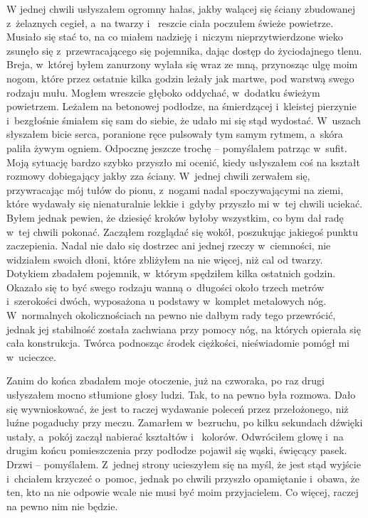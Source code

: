 W jednej chwili usłyszałem ogromny hałas, jakby walącej się ściany zbudowanej z~żelaznych cegieł, a~na twarzy i~
reszcie ciała poczułem świeże powietrze. Musiało się stać to, na co miałem nadzieję i~niczym nieprzytwierdzone wieko 
zsunęło się z~przewracającego się pojemnika, dając dostęp do życiodajnego tlenu. Breja, w~której byłem zanurzony 
wylała się wraz ze mną, przynosząc ulgę moim nogom, które przez ostatnie kilka godzin leżały jak martwe, pod warstwą 
swego rodzaju mułu. Mogłem wreszcie głęboko oddychać, w~dodatku świeżym powietrzem. Leżałem na betonowej podłodze, na 
śmierdzącej i~kleistej pierzynie i~bezgłośnie śmiałem się sam do siebie, że udało mi się stąd wydostać. W~uszach 
słyszałem bicie serca, poranione ręce pulsowały tym samym rytmem, a~skóra paliła żywym ogniem. Odpocznę jeszcze 
trochę -- pomyślałem patrząc w~sufit. Moją sytuację bardzo szybko przyszło mi ocenić, kiedy usłyszałem coś na kształt 
rozmowy dobiegający jakby zza ściany. W~jednej chwili zerwałem się, przywracając mój tułów do pionu, z~nogami nadal 
spoczywającymi na ziemi, które wydawały się nienaturalnie lekkie i~gdyby przyszło mi w~tej chwili uciekać. Byłem 
jednak pewien, że dziesięć kroków byłoby wszystkim, co bym dał radę w~tej chwili pokonać. Zacząłem rozglądać się 
wokół, poszukując jakiegoś punktu zaczepienia. Nadal nie dało się dostrzec ani jednej rzeczy w~ciemności, nie 
widziałem swoich dłoni, które zbliżyłem na nie więcej, niż cal od twarzy. Dotykiem zbadałem pojemnik, w~którym 
spędziłem kilka ostatnich godzin. Okazało się to być swego rodzaju wanną o~długości około trzech metrów i~szerokości 
dwóch, wyposażona u podstawy w~komplet metalowych nóg. W~normalnych okolicznościach na pewno nie dałbym rady tego 
przewrócić, jednak jej stabilność została zachwiana przy pomocy nóg, na których opierała się cała konstrukcja. Twórca 
podnosząc środek ciężkości, nieświadomie pomógł mi w~ucieczce. 

Zanim do końca zbadałem moje otoczenie, już na czworaka, po raz drugi usłyszałem mocno stłumione głosy ludzi. Tak, to 
na pewno była rozmowa. Dało się wywnioskować, że jest to raczej wydawanie poleceń przez przełożonego, niż luźne 
pogaduchy przy meczu. Zamarłem w~bezruchu, po kilku sekundach dźwięki ustały, a~pokój zaczął nabierać kształtów i~
kolorów. Odwróciłem głowę i~na drugim końcu pomieszczenia przy podłodze pojawił się wąski, święcący pasek. Drzwi -- 
pomyślałem. Z~jednej strony ucieszyłem się na myśl, że jest stąd wyjście i~chciałem krzyczeć o~pomoc, jednak po 
chwili przyszło opamiętanie i~obawa, że ten, kto na nie odpowie wcale nie musi być moim przyjacielem. Co więcej, 
raczej na pewno nim nie będzie. 

